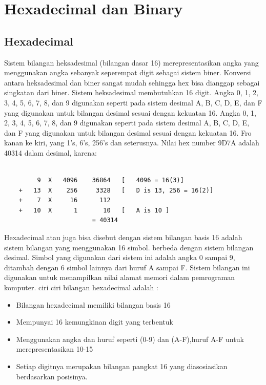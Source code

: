 \section {Hexadecimal dan Binary}

\subsection {Hexadecimal}
Sistem bilangan heksadesimal (bilangan dasar 16) merepresentasikan angka yang menggunakan angka sebanyak seperempat digit sebagai sistem biner. Konversi antara heksadesimal dan biner sangat mudah sehingga hex bisa dianggap sebagai singkatan dari biner. Sistem heksadesimal membutuhkan 16 digit. Angka 0, 1, 2, 3, 4, 5, 6, 7, 8, dan 9 digunakan seperti pada sistem desimal A, B, C, D, E, dan F yang digunakan untuk bilangan desimal sesuai dengan kekuatan 16. Angka 0, 1, 2, 3, 4, 5, 6, 7, 8, dan 9 digunakan seperti pada sistem desimal A, B, C, D, E, dan F yang digunakan untuk bilangan desimal sesuai dengan kekuatan 16. Fro kanan ke kiri, yang 1's, 6's, 256's dan seterusnya. Nilai hex number 9D7A adalah 40314 dalam desimal, karena:
	\begin{verbatim}

		 9	X	4096	36864	[	4096 = 16(3)]
	+	13	X	 256	 3328	[	D is 13, 256 = 16(2)]
	+	 7	X	  16	  112
	+	10	X	   1	   10	[	A is 10	]
						= 40314
	\end{verbatim}
	
Hexadecimal atau juga bisa disebut dengan sistem bilangan basis 16 adalah sistem bilangan yang menggunakan 16 simbol. berbeda dengan sistem bilangan desimal. Simbol yang digunakan dari sistem ini adalah angka 0 sampai 9, ditambah dengan 6 simbol lainnya dari huruf A sampai F. Sistem bilangan ini digunakan untuk menampilkan nilai alamat memori dalam pemrograman komputer.
ciri ciri bilangan hexadecimal adalah :

\begin{itemize}
	\item Bilangan hexadecimal memiliki bilangan basis 16
	\item Mempunyai 16 kemungkinan digit yang terbentuk
	\item Menggunakan angka dan huruf seperti (0-9) dan (A-F),huruf A-F untuk merepresentasikan 10-15
	\item Setiap digitnya merupakan bilangan pangkat 16 yang diasosiasikan berdasarkan posisinya.
\end{itemize}


